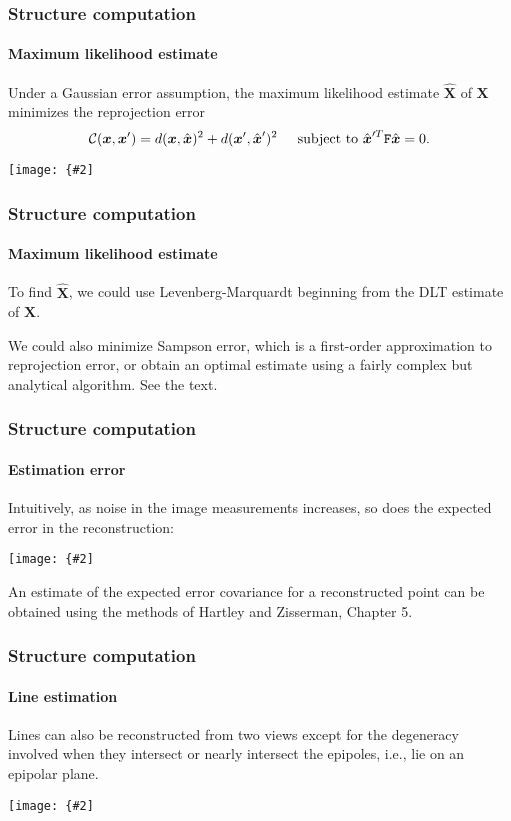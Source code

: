 \documentclass[aspectratio=169]{beamer}
\renewcommand{\vec}[1]{\boldsymbol{#1}}
\newcommand{\mat}[1]{\mathtt{#1}}
\newcommand{\myfig}[3]{\centerline{\texttt{[image: \{\#2]}}}
    \centerline{\scriptsize #3}}
\begin{document}
\begin{frame}
\frametitle{Structure computation}
\framesubtitle{Maximum likelihood estimate}

Under a Gaussian error assumption, the maximum likelihood estimate
$\hat{\vec{X}}$ of $\vec{X}$ minimizes the \alert{reprojection error}
\begin{equation*}
{\cal C}(\vec{x},\vec{x}')=d(\vec{x},\hat{\vec{x}})^2 +
d(\vec{x}',\hat{\vec{x}}')^2 \hspace{0.2in} \text{subject to\ }
\hat{\vec{x}}^{\prime T}\mat{F}\hat{\vec{x}}=0.
\end{equation*}

\myfig{3in}{HZ-fig11-2}{Hartley and Zisserman (2004), Fig.\ 11.2}

\end{frame}

\begin{frame}
\frametitle{Structure computation}
\framesubtitle{Maximum likelihood estimate}

To find $\hat{\vec{X}}$, we \alert{could} use Levenberg-Marquardt
beginning from the DLT estimate of $\vec{X}$.

\medskip

We could also minimize \alert{Sampson error}, which is a first-order
approximation to reprojection error, or obtain an \alert{optimal}
estimate using a fairly complex but analytical algorithm.  See the
text.

\end{frame}

\begin{frame}
\frametitle{Structure computation}
\framesubtitle{Estimation error}

Intuitively, as noise in the image measurements increases, so does the
expected error in the reconstruction:

\medskip

\myfig{4.5in}{HZ-fig11-6}{Hartley and Zisserman, Fig.\ 12.6}

\medskip

An estimate of the expected error covariance for a reconstructed point
can be obtained using the methods of Hartley and Zisserman, Chapter 5.

\end{frame}

\begin{frame}
\frametitle{Structure computation}
\framesubtitle{Line estimation}

\alert{Lines} can also be reconstructed from two views except for the
degeneracy involved when they intersect or nearly intersect the
epipoles, i.e., lie on an epipolar plane.

\medskip

\myfig{3in}{HZ-fig11-7}{Hartley and Zisserman, Fig.\ 12.7}

\end{frame}
\end{document}

